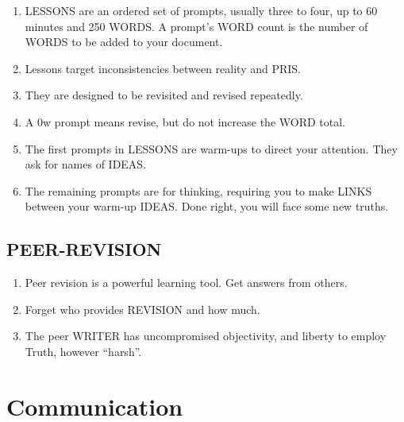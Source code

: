 \documentclass[
]{book}
\providecommand{\tightlist}{%
  \setlength{\itemsep}{0pt}\setlength{\parskip}{0pt}}
\begin{document}
\begin{enumerate}
\def\labelenumi{\arabic{enumi}.}
\setcounter{enumi}{32}
\tightlist
\item
  LESSONS are an ordered set of prompts, usually three to four, up to 60 minutes and 250 WORDS. A prompt's WORD count is the number of WORDS to be added to your document.
\item
  Lessons target inconsistencies between reality and PRIS.
\item
  They are designed to be revisited and revised repeatedly.
\item
  A 0w prompt means revise, but do not increase the WORD total.
\item
  The first prompts in LESSONS are warm-ups to direct your attention. They ask for names of IDEAS.
\item
  The remaining prompts are for thinking, requiring you to make LINKS between your warm-up IDEAS. Done right, you will face some new truths.
\end{enumerate}

\hypertarget{peer-revision}{%
\section{PEER-REVISION}\label{peer-revision}}

\begin{enumerate}
\def\labelenumi{\arabic{enumi}.}
\setcounter{enumi}{38}
\tightlist
\item
  Peer revision is a powerful learning tool. Get answers from others.
\item
  Forget who provides REVISION and how much.
\item
  The peer WRITER has uncompromised objectivity, and liberty to employ Truth, however ``harsh''.
\end{enumerate}

\hypertarget{communication}{%
\chapter{Communication}\label{communication}}
\end{document}
